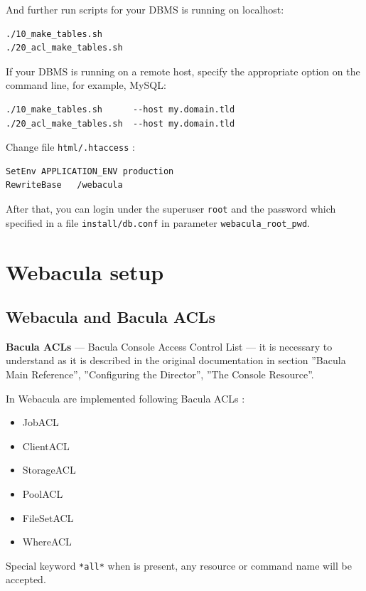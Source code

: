 \documentclass[10pt]{article}
\begin{document}
And further run scripts for your DBMS is running on localhost:
\begin{verbatim}
./10_make_tables.sh
./20_acl_make_tables.sh
\end{verbatim}

If your DBMS is running on a remote host, specify the appropriate option on the command line,
for example, MySQL:
\begin{verbatim}
./10_make_tables.sh      --host my.domain.tld
./20_acl_make_tables.sh  --host my.domain.tld
\end{verbatim}



Change file \texttt{html/.htaccess} :
\begin{verbatim}
SetEnv APPLICATION_ENV production
RewriteBase   /webacula
\end{verbatim}

After that, you can login under the superuser \texttt{root} and the password which specified in a file \texttt{install/db.conf}
in parameter \texttt{webacula\_root\_pwd}.



\section{Webacula setup}
\label{Setup}



\subsection{Webacula and Bacula ACLs}
\label{Setup:Webacula and Bacula ACLs}

\textbf{Bacula ACLs} --- Bacula Console Access Control List ---
it is necessary to understand as it is described in the original documentation in section
''Bacula Main Reference'', ''Configuring the Director'', ''The Console Resource''.

In Webacula are implemented following Bacula ACLs :
\begin{itemize}
  \item JobACL
  \item ClientACL
  \item StorageACL
  \item PoolACL
  \item FileSetACL
  \item WhereACL
\end{itemize}

Special keyword \texttt{*all*} when is present, any resource or command name will be accepted.
\end{document}
